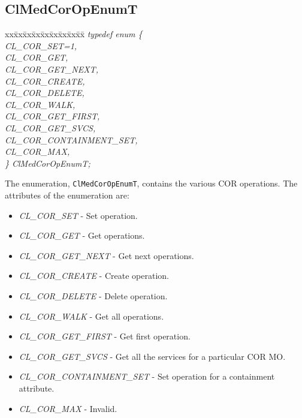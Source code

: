 \begin{flushleft}
\subsection{ClMedCorOpEnumT}
\begin{tabbing}
xx\=xx\=xx\=xx\=xx\=xx\=xx\=xx\=xx\=\kill
\textit{typedef enum \{}\\
\>\>\>\>\textit{CL\_COR\_SET=1,}\\
\>\>\>\>\textit{CL\_COR\_GET,}\\
\>\>\>\>\textit{CL\_COR\_GET\_NEXT,}\\
\>\>\>\>\textit{CL\_COR\_CREATE,}\\
\>\>\>\>\textit{CL\_COR\_DELETE,}\\
\>\>\>\>\textit{CL\_COR\_WALK,}\\
\>\>\>\>\textit{CL\_COR\_GET\_FIRST,}\\
\>\>\>\>\textit{CL\_COR\_GET\_SVCS,}\\
\>\>\>\>\textit{CL\_COR\_CONTAINMENT\_SET,}\\
\>\>\>\>\textit{CL\_COR\_MAX,}\\
\textit{\} ClMedCorOpEnumT;}\end{tabbing}
The enumeration, {\tt{ClMedCorOpEnumT}}, contains the various COR operations. The attributes of the enumeration are:
\begin{itemize}
\item
\textit{CL\_\-COR\_\-SET} - Set operation.
\item
\textit{CL\_\-COR\_\-GET} - Get operations.
\item
\textit{CL\_\-COR\_\-GET\_\-NEXT} - Get next operations.
\item
\textit{CL\_\-COR\_\-CREATE} - Create operation.
\item
\textit{CL\_\-COR\_\-DELETE} - Delete operation.
\item
\textit{CL\_\-COR\_\-WALK} - Get all operations.
\item
\textit{CL\_\-COR\_\-GET\_\-FIRST} - Get first operation.
\item
\textit{CL\_\-COR\_\-GET\_\-SVCS} - Get all the services for a particular COR MO.
\item
\textit{CL\_\-COR\_\-CONTAINMENT\_\-SET} - Set operation for a containment attribute.
\item
\textit{CL\_\-COR\_\-MAX} - Invalid.
\end{itemize}



\end{flushleft}
